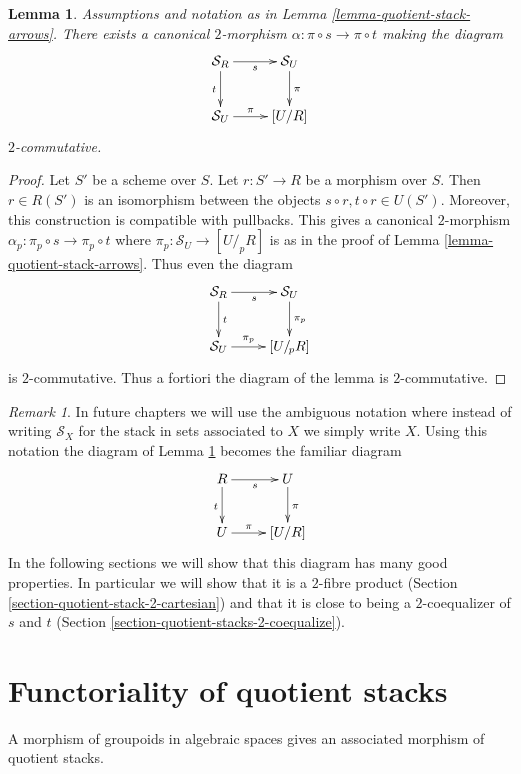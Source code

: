 \documentclass{stacks-project}
\theoremstyle{plain}
\newtheorem{lemma}[subsection]{Lemma}
\theoremstyle{definition}
\theoremstyle{remark}
\newtheorem{remark}[subsection]{Remark}
\numberwithin{equation}{subsection}
\begin{document}
\begin{lemma}
\label{lemma-quotient-stack-2-arrow}
Assumptions and notation as in Lemma \ref{lemma-quotient-stack-arrows}.
There exists a canonical $2$-morphism
$\alpha : \pi \circ s \to \pi \circ t$ making the diagram
$$
\xymatrix{
\mathcal{S}_R \ar[r]_s \ar[d]_t & \mathcal{S}_U \ar[d]^\pi \\
\mathcal{S}_U \ar[r]^-\pi & [U/R]
}
$$
$2$-commutative.
\end{lemma}

\begin{proof}
Let $S'$ be a scheme over $S$. Let $r : S' \to R$ be a morphism over $S$.
Then $r \in R(S')$ is an isomorphism between the objects
$s \circ r, t \circ r \in U(S')$. Moreover, this construction is
compatible with pullbacks. This gives a canonical
$2$-morphism $\alpha_p : \pi_p \circ s \to \pi_p \circ t$
where $\pi_p : \mathcal{S}_U \to [U/_{\!p}R]$ is as in the
proof of
Lemma \ref{lemma-quotient-stack-arrows}. Thus even the diagram
$$
\xymatrix{
\mathcal{S}_R \ar[r]_s \ar[d]^t & \mathcal{S}_U \ar[d]^{\pi_p} \\
\mathcal{S}_U \ar[r]^-{\pi_p} & [U/_{\!p}R]
}
$$
is $2$-commutative. Thus a fortiori the diagram
of the lemma is $2$-commutative.
\end{proof}

\begin{remark}
\label{remark-fundamental-square}
In future chapters we will use the ambiguous notation where
instead of writing $\mathcal{S}_X$ for the stack in sets associated
to $X$ we simply write $X$. Using this notation the diagram of
Lemma \ref{lemma-quotient-stack-2-arrow}
becomes the familiar diagram
$$
\xymatrix{
R \ar[r]_s \ar[d]_t & U \ar[d]^\pi \\
U \ar[r]^-\pi & [U/R]
}
$$
In the following sections we will show that this diagram has
many good properties. In particular we will show that it is
a $2$-fibre product
(Section \ref{section-quotient-stack-2-cartesian})
and that it is close to being a $2$-coequalizer of $s$ and $t$
(Section \ref{section-quotient-stacks-2-coequalize}).
\end{remark}




\section{Functoriality of quotient stacks}
\label{section-functoriality-quotient-stacks}

\noindent
A morphism of groupoids in algebraic spaces gives an associated morphism
of quotient stacks.
\end{document}
